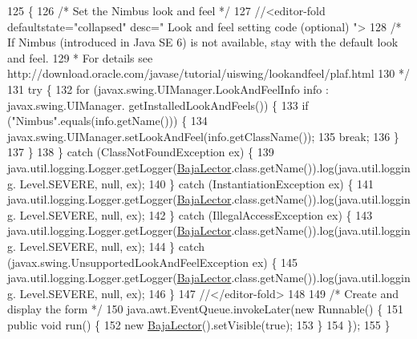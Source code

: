 \begin{DoxyCode}
125                                            \{
126         \textcolor{comment}{/* Set the Nimbus look and feel */}
127         \textcolor{comment}{//<editor-fold defaultstate="collapsed" desc=" Look and feel setting code (optional) ">}
128         \textcolor{comment}{/* If Nimbus (introduced in Java SE 6) is not available, stay with the default look and feel.}
129 \textcolor{comment}{         * For details see http://download.oracle.com/javase/tutorial/uiswing/lookandfeel/plaf.html }
130 \textcolor{comment}{         */}
131         \textcolor{keywordflow}{try} \{
132             \textcolor{keywordflow}{for} (javax.swing.UIManager.LookAndFeelInfo info : javax.swing.UIManager.
      getInstalledLookAndFeels()) \{
133                 \textcolor{keywordflow}{if} (\textcolor{stringliteral}{"Nimbus"}.equals(info.getName())) \{
134                     javax.swing.UIManager.setLookAndFeel(info.getClassName());
135                     \textcolor{keywordflow}{break};
136                 \}
137             \}
138         \} \textcolor{keywordflow}{catch} (ClassNotFoundException ex) \{
139             java.util.logging.Logger.getLogger(\mbox{\hyperlink{class_interfaz_package_1_1_baja_lector_a524ec2212ed63f49b7de4c5743319766}{BajaLector}}.class.getName()).log(java.util.logging.
      Level.SEVERE, null, ex);
140         \} \textcolor{keywordflow}{catch} (InstantiationException ex) \{
141             java.util.logging.Logger.getLogger(\mbox{\hyperlink{class_interfaz_package_1_1_baja_lector_a524ec2212ed63f49b7de4c5743319766}{BajaLector}}.class.getName()).log(java.util.logging.
      Level.SEVERE, null, ex);
142         \} \textcolor{keywordflow}{catch} (IllegalAccessException ex) \{
143             java.util.logging.Logger.getLogger(\mbox{\hyperlink{class_interfaz_package_1_1_baja_lector_a524ec2212ed63f49b7de4c5743319766}{BajaLector}}.class.getName()).log(java.util.logging.
      Level.SEVERE, null, ex);
144         \} \textcolor{keywordflow}{catch} (javax.swing.UnsupportedLookAndFeelException ex) \{
145             java.util.logging.Logger.getLogger(\mbox{\hyperlink{class_interfaz_package_1_1_baja_lector_a524ec2212ed63f49b7de4c5743319766}{BajaLector}}.class.getName()).log(java.util.logging.
      Level.SEVERE, null, ex);
146         \}
147         \textcolor{comment}{//</editor-fold>}
148 
149         \textcolor{comment}{/* Create and display the form */}
150         java.awt.EventQueue.invokeLater(\textcolor{keyword}{new} Runnable() \{
151             \textcolor{keyword}{public} \textcolor{keywordtype}{void} run() \{
152                 \textcolor{keyword}{new} \mbox{\hyperlink{class_interfaz_package_1_1_baja_lector_a524ec2212ed63f49b7de4c5743319766}{BajaLector}}().setVisible(\textcolor{keyword}{true});
153             \}
154         \});
155     \}
\end{DoxyCode}


